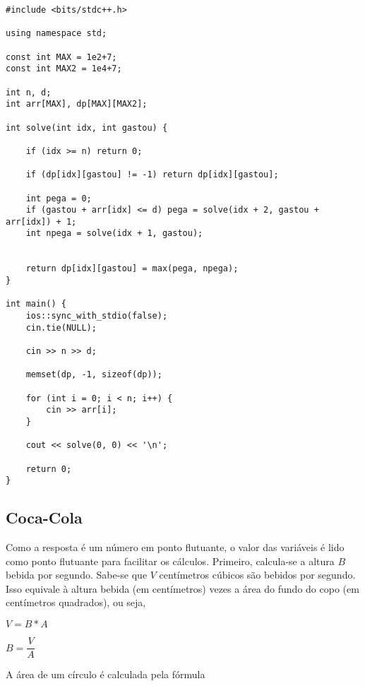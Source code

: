 \documentclass[11pt,fancychapters]{article}
\begin{document}
\begin{lstlisting}[style=c++]
#include <bits/stdc++.h>

using namespace std;

const int MAX = 1e2+7;
const int MAX2 = 1e4+7;

int n, d;
int arr[MAX], dp[MAX][MAX2];

int solve(int idx, int gastou) {
    
    if (idx >= n) return 0;
    
    if (dp[idx][gastou] != -1) return dp[idx][gastou];
    
    int pega = 0;
    if (gastou + arr[idx] <= d) pega = solve(idx + 2, gastou + arr[idx]) + 1;
    int npega = solve(idx + 1, gastou);
    
    
    return dp[idx][gastou] = max(pega, npega);
}

int main() {
    ios::sync_with_stdio(false);
    cin.tie(NULL);
    
    cin >> n >> d;
    
    memset(dp, -1, sizeof(dp));
    
    for (int i = 0; i < n; i++) {
        cin >> arr[i];
    }
    
    cout << solve(0, 0) << '\n';

    return 0;
}
\end{lstlisting}
\newpage
\begin{center}\section{Coca-Cola}\end{center}
\noindent
Como a resposta é um número em ponto flutuante, o valor das variáveis é lido como ponto flutuante para facilitar os cálculos. Primeiro, calcula-se a altura $B$ bebida por segundo. Sabe-se que $V$ centímetros cúbicos são bebidos por segundo. Isso equivale à altura bebida (em centímetros) vezes a área do fundo do copo (em centímetros quadrados), ou seja,
\newline
\begin{center}
\begin{math}
    V = B * A
\end{math}
\end{center}
\begin{center}
\begin{math}
    B = \dfrac{V}{A}
\end{math}
\end{center}
A área de um círculo é calculada pela fórmula
\end{document}
